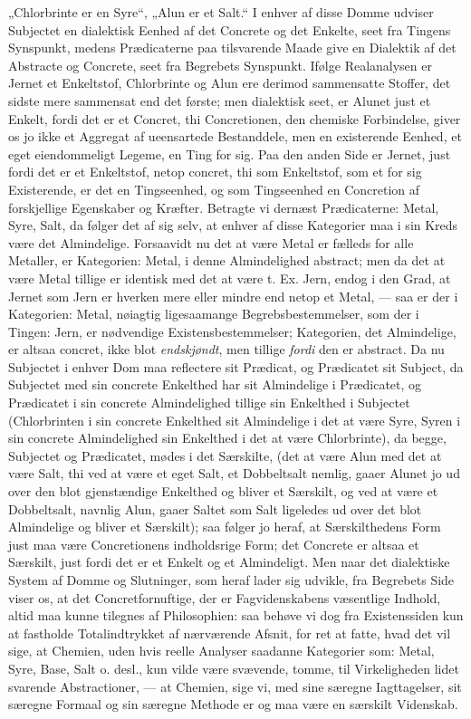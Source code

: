 \documentclass[12pt,a4paper]{book}
\begin{document}
„Chlorbrinte er en Syre“, „Alun er et Salt.“ I
enhver af disse Domme udviser Subjectet en dialektisk
Eenhed af det Concrete og det Enkelte, seet fra Tingens
Synspunkt, medens Prædicaterne paa tilsvarende Maade give
en Dialektik af det Abstracte og Concrete, seet fra Begrebets
Synspunkt. Ifølge Realanalysen er Jernet et Enkeltstof,
Chlorbrinte og Alun ere derimod sammensatte Stoffer, det sidste
mere sammensat end det første; men dialektisk seet, er Alunet
just et Enkelt, fordi det er et Concret, thi Concretionen, den
chemiske Forbindelse, giver os jo ikke et Aggregat af ueensartede
Bestanddele, men en existerende Eenhed, et eget eiendommeligt
Legeme, en Ting for sig. Paa den anden Side er Jernet, just
fordi det er et Enkeltstof, netop concret, thi som Enkeltstof, som et
for sig Existerende, er det en Tingseenhed, og som Tingseenhed
en Concretion af forskjellige Egenskaber og Kræfter. Betragte
vi dernæst Prædicaterne: Metal, Syre, Salt, da følger det
af sig selv, at enhver af disse Kategorier maa i sin Kreds
være det Almindelige. Forsaavidt nu det at være Metal er
fælleds for alle Metaller, er Kategorien: Metal, i denne
Almindelighed abstract; men da det at være Metal tillige er
identisk med det at være t. Ex. Jern, endog i den Grad, at
Jernet som Jern er hverken mere eller mindre end netop et
Metal, --- saa er der i Kategorien: Metal, nøiagtig ligesaamange
Begrebsbestemmelser, som der i Tingen: Jern, er nødvendige
Existensbestemmelser; Kategorien, det Almindelige, er altsaa
concret, ikke blot \emph{endskjøndt}, men tillige \emph{fordi} den er
abstract. Da nu Subjectet i enhver Dom maa reflectere sit
Prædicat, og Prædicatet sit Subject, da Subjectet med sin
concrete Enkelthed har sit Almindelige i Prædicatet, og
Prædicatet i sin concrete Almindelighed tillige sin Enkelthed i
Subjectet (Chlorbrinten i sin concrete Enkelthed sit Almindelige
i det at være Syre, Syren i sin concrete Almindelighed
sin Enkelthed i det at være Chlorbrinte), da begge, Subjectet
og Prædicatet, mødes i det Særskilte, (det at være
Alun med det at være Salt, thi ved at være et eget Salt,
et Dobbeltsalt nemlig, gaaer Alunet jo ud over den blot
gjenstændige Enkelthed og bliver et Særskilt, og ved at være
et Dobbeltsalt, navnlig Alun, gaaer Saltet som Salt ligeledes
ud over det blot Almindelige og bliver et Særskilt);
saa følger jo heraf, at Særskilthedens Form just maa være
Concretionens indholdsrige Form; det Concrete er altsaa et
Særskilt, just fordi det er et Enkelt og et Almindeligt. Men
naar det dialektiske System af Domme og Slutninger, som
heraf lader sig udvikle, fra Begrebets Side viser os, at det
Concretfornuftige, der er Fagvidenskabens væsentlige Indhold,
altid maa kunne tilegnes af Philosophien: saa behøve vi dog
fra Existenssiden kun at fastholde Totalindtrykket af nærværende
Afsnit, for ret at fatte, hvad det vil sige, at Chemien,
uden hvis reelle Analyser saadanne Kategorier som: Metal,
Syre, Base, Salt o. desl., kun vilde være svævende, tomme,
til Virkeligheden lidet svarende Abstractioner, --- at Chemien,
sige vi, med sine særegne Iagttagelser, sit særegne Formaal og
sin særegne Methode er og maa være en særskilt Videnskab.
\end{document}
